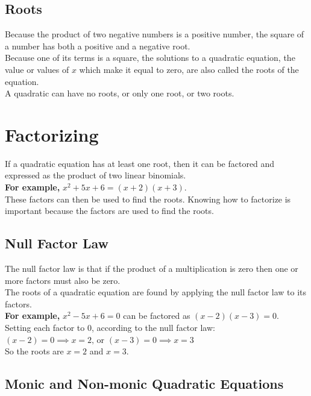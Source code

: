 \documentclass[12pt]{article}
\begin{document}
\subsection*{Roots}
Because the product of two negative numbers is a positive number, the square of a number has both a positive and a negative root.\\

Because one of its terms is a square, the solutions to a quadratic equation, the value or values of $x$ which make it equal to zero, are also called the roots of the equation.\\

A quadratic can have no roots, or only one root, or two roots.

\section*{Factorizing}

If a quadratic equation has at least one root, then it can be factored and  expressed as the product of two linear binomials.\\

\textbf{For example,} $x^2+5x+6=(x+2)(x+3)$.\\

These factors can then be used to find the roots. Knowing how to factorize is important because the factors are used to find the roots.

\subsection*{Null Factor Law}
The null factor law is that if the product of a multiplication is zero then one or more factors must also be zero.\\

The roots of a quadratic equation are found by applying the null factor law to its factors.\\

\textbf{For example,} $x^2 - 5x + 6 = 0$ can be factored as $(x - 2)(x - 3) = 0$.\\

Setting each factor to 0, according to the null factor law:\\

$(x - 2) = 0 \implies x = 2 \textrm{, or } (x - 3) = 0 \implies x = 3$\\

So the roots are $x=2$ and $x=3$.

\subsection*{Monic and Non-monic Quadratic Equations}
\end{document}
